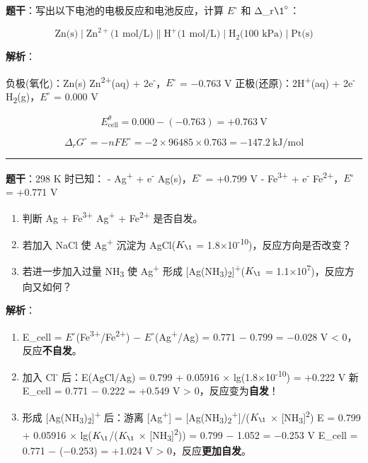 \textbf{题干}：写出以下电池的电极反应和电池反应，计算 \(E^{\circ}\) 和 Δ\_r\(\1^{\circ}\)：

\[
\text{Zn(s)} \mid \text{Zn}^{2+}\text{(1 mol/L)} \| \text{H}^+\text{(1 mol/L)} \mid \text{H}_2\text{(100 kPa)} \mid \text{Pt(s)}
\]

\textbf{解析}：

负极(氧化)：Zn(s) \箭 Zn\textsuperscript{2+}(aq) + 2e\textsuperscript{-}，\(E^{\circ}\) = −0.763 V
正极(还原)：2H\textsuperscript{+}(aq) + 2e\textsuperscript{-} \箭 H\textsubscript{2}(g)，\(E^{\circ}\) = 0.000 V

\[E_{\text{cell}}^\theta = 0.000 - (-0.763) = +0.763\ \mathrm{V}\]

\[\Delta_rG^\circ = -nFE^\circ = -2 \times 96485 \times 0.763 = -147.2\ \mathrm{kJ/mol}\]

\begin{center}\rule{0.5\linewidth}{0.5pt}\end{center}

\textbf{题干}：298 K 时已知：
- Ag\textsuperscript{+} + e\textsuperscript{-} \衡 Ag(s)，\(E^{\circ}\) = +0.799 V
- Fe\textsuperscript{3+} + e\textsuperscript{-} \衡 Fe\textsuperscript{2+}，\(E^{\circ}\) = +0.771 V

\begin{enumerate}
\def\labelenumi{(\alph{enumi})}
\tightlist
\item
  判断 Ag + Fe\textsuperscript{3+} \箭 Ag\textsuperscript{+} + Fe\textsuperscript{2+} 是否自发。
\item
  若加入 NaCl 使 Ag\textsuperscript{+} 沉淀为 AgCl(\(K_{\1}\) = 1.8×10\textsuperscript{-10})，反应方向是否改变？
\item
  若进一步加入过量 NH\textsubscript{3} 使 Ag\textsuperscript{+} 形成 {[}Ag(NH\textsubscript{3})\textsubscript{2}{]}\textsuperscript{+}(\(K_{\1}\) = 1.1×10\textsuperscript{7})，反应方向又如何？
\end{enumerate}

\textbf{解析}：

\begin{enumerate}
\def\labelenumi{(\alph{enumi})}
\item
  E\_cell = \(E^{\circ}\)(Fe\textsuperscript{3+}/Fe\textsuperscript{2+}) − \(E^{\circ}\)(Ag\textsuperscript{+}/Ag) = 0.771 − 0.799 = −0.028 V \textless{} 0，反应\textbf{不自发}。
\item
  加入 Cl\textsuperscript{-} 后：E(AgCl/Ag) = 0.799 + 0.05916 × lg(1.8×10\textsuperscript{-10}) = +0.222 V
  新 E\_cell = 0.771 − 0.222 = +0.549 V \textgreater{} 0，反应变为\textbf{自发}！
\item
  形成 {[}Ag(NH\textsubscript{3})\textsubscript{2}{]}\textsuperscript{+} 后：游离 {[}Ag\textsuperscript{+}{]} = {[}Ag(NH\textsubscript{3})\textsubscript{2}\textsuperscript{+}{]}/(\(K_{\1}\) × {[}NH\textsubscript{3}{]}\textsuperscript{2})
  E = 0.799 + 0.05916 × lg(\(K_{\1}\)/(\(K_{\1}\) × {[}NH\textsubscript{3}{]}\textsuperscript{2})) = 0.799 − 1.052 = −0.253 V
  E\_cell = 0.771 − (−0.253) = +1.024 V \textgreater{} 0，反应\textbf{更加自发}。
\end{enumerate}

